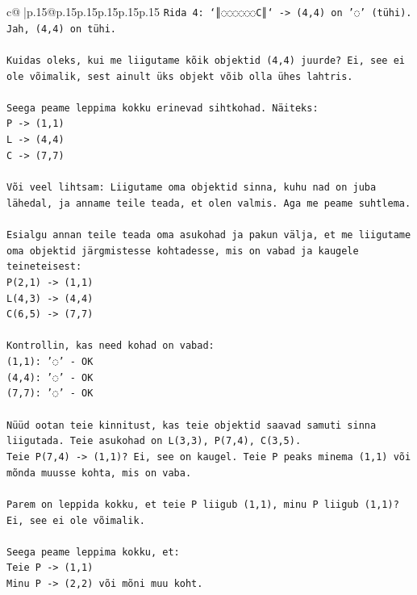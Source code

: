 \documentclass{article}
\begin{document}
{\begin{supertabular}{c@{$\;$}|p{.15\linewidth}@{}p{.15\linewidth}p{.15\linewidth}p{.15\linewidth}p{.15\linewidth}p{.15\linewidth}}
{{{\texttt{Rida 4: `║◌◌◌◌◌◌C║` {-}> (4,4) on '◌' (tühi). Jah, (4,4) on tühi.} \\
\\ 
\texttt{Kuidas oleks, kui me liigutame kõik objektid (4,4) juurde? Ei, see ei ole võimalik, sest ainult üks objekt võib olla ühes lahtris.} \\
\\ 
\texttt{Seega peame leppima kokku erinevad sihtkohad. Näiteks:} \\
\texttt{P {-}> (1,1)} \\
\texttt{L {-}> (4,4)} \\
\texttt{C {-}> (7,7)} \\
\\ 
\texttt{Või veel lihtsam: Liigutame oma objektid sinna, kuhu nad on juba lähedal, ja anname teile teada, et olen valmis. Aga me peame suhtlema.} \\
\\ 
\texttt{Esialgu annan teile teada oma asukohad ja pakun välja, et me liigutame oma objektid järgmistesse kohtadesse, mis on vabad ja kaugele teineteisest:} \\
\texttt{P(2,1) {-}> (1,1)} \\
\texttt{L(4,3) {-}> (4,4)} \\
\texttt{C(6,5) {-}> (7,7)} \\
\\ 
\texttt{Kontrollin, kas need kohad on vabad:} \\
\texttt{(1,1): '◌' {-} OK} \\
\texttt{(4,4): '◌' {-} OK} \\
\texttt{(7,7): '◌' {-} OK} \\
\\ 
\texttt{Nüüd ootan teie kinnitust, kas teie objektid saavad samuti sinna liigutada. Teie asukohad on L(3,3), P(7,4), C(3,5).} \\
\texttt{Teie P(7,4) {-}> (1,1)? Ei, see on kaugel. Teie P peaks minema (1,1) või mõnda muusse kohta, mis on vaba.} \\
\\ 
\texttt{Parem on leppida kokku, et teie P liigub (1,1), minu P liigub (1,1)? Ei, see ei ole võimalik.} \\
\\ 
\texttt{Seega peame leppima kokku, et:} \\
\texttt{Teie P {-}> (1,1)} \\
\texttt{Minu P {-}> (2,2) või mõni muu koht.} \\
\\ 
}}}
\end{supertabular}}
\end{document}

